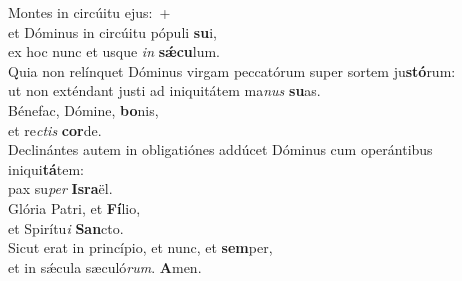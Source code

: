 \evenverse Montes in circúitu ejus:~+\\\evenverse  et Dóminus in circúitu pópuli \textbf{su}i,~\*\\
\evenverse ex hoc nunc et usque \textit{in} \textbf{sǽ}\textbf{cu}lum.\\
\oddverse Quia non relínquet Dóminus virgam peccatórum super sortem ju\textbf{stó}rum:~\*\\
\oddverse ut non exténdant justi ad iniquitátem ma\textit{nus} \textbf{su}as.\\
\evenverse Bénefac, Dómine, \textbf{bo}nis,~\*\\
\evenverse et re\textit{ctis} \textbf{cor}de.\\
\oddverse Declinántes autem in obligatiónes addúcet Dóminus cum operántibus iniqui\textbf{tá}tem:~\*\\
\oddverse pax su\textit{per} \textbf{Is}\textbf{ra}ël.\\
\evenverse Glória Patri, et \textbf{Fí}lio,~\*\\
\evenverse et Spirítu\textit{i} \textbf{San}cto.\\
\oddverse Sicut erat in princípio, et nunc, et \textbf{sem}per,~\*\\
\oddverse et in sǽcula sæculó\textit{rum}. \textbf{A}men.\\

